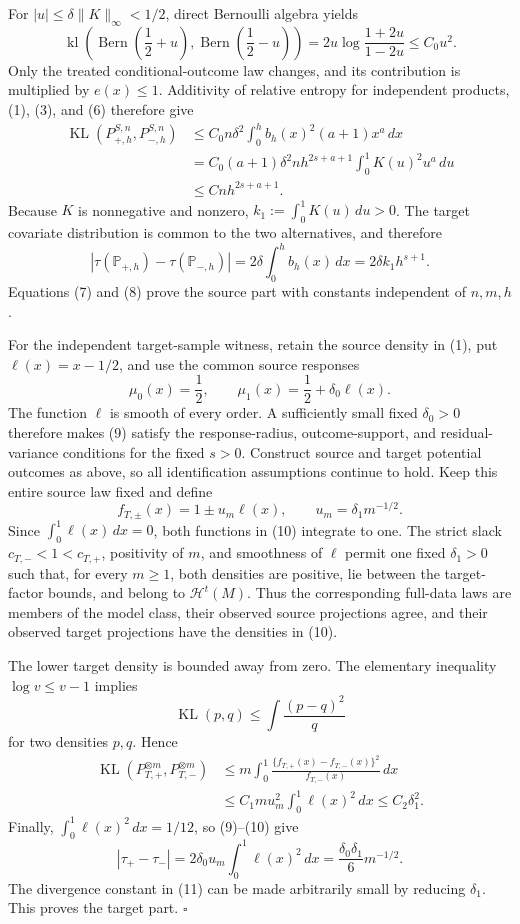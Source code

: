 For \(|u|\le\delta\lVert K\rVert_\infty<1/2\), direct Bernoulli algebra yields
\[
 \operatorname{kl}\!\left(
   \operatorname{Bern}\!\left(\frac12+u\right),
   \operatorname{Bern}\!\left(\frac12-u\right)
 \right)
 =2u\log\frac{1+2u}{1-2u}
 \le C_0u^2.
\tag{6}
\]
Only the treated conditional-outcome law changes, and its contribution is multiplied by \(e(x)\le1\).  Additivity of relative entropy for independent products, (1), (3), and (6) therefore give
\[
\begin{aligned}
 \operatorname{KL}(P_{+,h}^{S,n},P_{-,h}^{S,n})
 &\le C_0n\delta^2\int_0^hb_h(x)^2(a+1)x^a\,dx\\
 &=C_0(a+1)\delta^2nh^{2s+a+1}
   \int_0^1K(u)^2u^a\,du\\
 &\le Cnh^{2s+a+1}.
\end{aligned}
\tag{7}
\]
Because \(K\) is nonnegative and nonzero,
\(k_1:=\int_0^1K(u)\,du>0\).  The target covariate distribution is common to the two alternatives, and therefore
\[
 \left|\tau(\mathbb P_{+,h})-\tau(\mathbb P_{-,h})\right|
 =2\delta\int_0^hb_h(x)\,dx
 =2\delta k_1h^{s+1}.
\tag{8}
\]
Equations (7) and (8) prove the source part with constants independent of \(n,m,h\).

For the independent target-sample witness, retain the source density in (1), put \(\ell(x)=x-1/2\), and use the common source responses
\[
 \mu_0(x)=\frac12,
 \qquad
 \mu_1(x)=\frac12+\delta_0\ell(x).
\tag{9}
\]
The function \(\ell\) is smooth of every order.  A sufficiently small fixed \(\delta_0>0\) therefore makes (9) satisfy the response-radius, outcome-support, and residual-variance conditions for the fixed \(s>0\).  Construct source and target potential outcomes as above, so all identification assumptions continue to hold.  Keep this entire source law fixed and define
\[
 f_{T,\pm}(x)=1\pm u_m\ell(x),
 \qquad
 u_m=\delta_1m^{-1/2}.
\tag{10}
\]
Since \(\int_0^1\ell(x)\,dx=0\), both functions in (10) integrate to one.  The strict slack \(c_{T,-}<1<c_{T,+}\), positivity of \(m\), and smoothness of \(\ell\) permit one fixed \(\delta_1>0\) such that, for every \(m\ge1\), both densities are positive, lie between the target-factor bounds, and belong to \(\mathcal H^t(M)\).  Thus the corresponding full-data laws are members of the model class, their observed source projections agree, and their observed target projections have the densities in (10).

The lower target density is bounded away from zero.  The elementary inequality \(\log v\le v-1\) implies
\[
 \operatorname{KL}(p,q)
 \le\int\frac{(p-q)^2}{q}
\]
for two densities \(p,q\).  Hence
\[
\begin{aligned}
 \operatorname{KL}(P_{T,+}^{\otimes m},P_{T,-}^{\otimes m})
 &\le m\int_0^1
 \frac{\{f_{T,+}(x)-f_{T,-}(x)\}^2}{f_{T,-}(x)}\,dx\\
 &\le C_1mu_m^2\int_0^1\ell(x)^2\,dx
 \le C_2\delta_1^2.
\end{aligned}
\tag{11}
\]
Finally, \(\int_0^1\ell(x)^2\,dx=1/12\), so (9)--(10) give
\[
 \left|\tau_+-\tau_-\right|
 =2\delta_0u_m\int_0^1\ell(x)^2\,dx
 =\frac{\delta_0\delta_1}{6}m^{-1/2}.
\tag{12}
\]
The divergence constant in (11) can be made arbitrarily small by reducing \(\delta_1\).  This proves the target part. \(\square\)